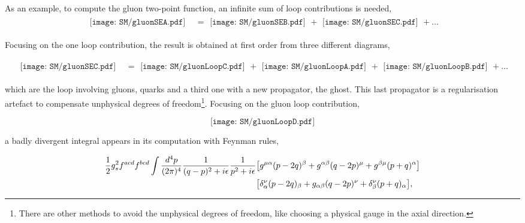 As an example, to compute the gluon two-point function, an infinite sum of loop contributions is needed,
\begin{align}
\begin{gathered}
    \texttt{[image: SM/gluonSEA.pdf]}
\end{gathered}&=\begin{gathered}\texttt{[image: SM/gluonSEB.pdf]}
\end{gathered}+\begin{gathered}\texttt{[image: SM/gluonSEC.pdf]}
\end{gathered}+...
\end{align}

Focusing on the one loop contribution, the result is obtained at first order from three different diagrams,


\begin{align}
    \begin{gathered}
        \texttt{[image: SM/gluonSEC.pdf]}
    \end{gathered}&=\begin{gathered}\texttt{[image: SM/gluonLoopC.pdf]}
    \end{gathered}+\begin{gathered}\texttt{[image: SM/gluonLoopA.pdf]}
    \end{gathered}+\begin{gathered}\texttt{[image: SM/gluonLoopB.pdf]}
    \end{gathered}+ ...
    \end{align}


which are the loop involving gluons, quarks and a third one with a new propagator, the ghost. This last propagator is a regularisation artefact to compensate unphysical degrees of freedom\footnote{There are other methods to avoid the unphysical degrees of freedom, like choosing a physical gauge in the axial direction.}. Focusing on the gluon loop contribution,

\begin{equation}
\texttt{[image: SM/gluonLoopD.pdf]}
\end{equation}

a badly divergent integral appears in its computation with Feynman rules,  

\begin{align}
    \begin{split} 
        \frac{1}{2}g_s^2f^{acd}f^{bcd}\int\frac{d^4p}{(2\pi)^4} \frac{1}{(q-p)^2+i\epsilon}\frac{1}{p^2+i\epsilon}&\qty[g^{\mu\alpha}(p-2q)^\beta+g^{\alpha\beta}(q-2p)^\mu+g^{\beta\mu}(p+q)^\alpha]\\
       &\qty[\delta_\alpha^\nu(p-2q)_\beta+g_{\alpha\beta}(q-2p)^\nu+\delta_\beta^\nu(p+q)_\alpha],
       \label{ipi}
    \end{split}
    \end{align}

